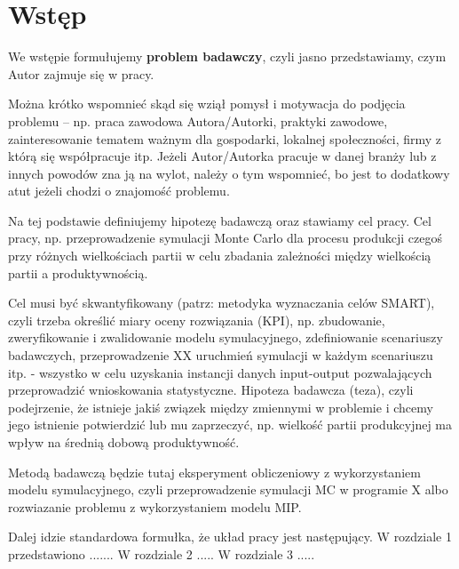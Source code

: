 \section*{Wstęp} 

We wstępie formułujemy \textbf{problem badawczy}, czyli jasno przedstawiamy, czym Autor zajmuje się w pracy.


Można krótko wspomnieć skąd się wziął pomysł i motywacja do podjęcia problemu -- np. praca zawodowa Autora/Autorki, praktyki zawodowe, zainteresowanie tematem ważnym dla gospodarki, lokalnej społeczności, firmy z którą się współpracuje itp. Jeżeli Autor/Autorka pracuje w danej branży lub z innych powodów zna ją na wylot, należy o tym wspomnieć, bo jest to dodatkowy atut jeżeli chodzi o znajomość problemu. 


Na tej podstawie definiujemy hipotezę badawczą oraz stawiamy cel pracy. Cel pracy, np. przeprowadzenie symulacji Monte Carlo dla procesu produkcji czegoś przy różnych wielkościach partii w celu zbadania zależności między wielkością partii a produktywnością.


Cel musi być skwantyfikowany (patrz: metodyka wyznaczania celów SMART), czyli trzeba określić miary oceny rozwiązania (KPI), np. zbudowanie, zweryfikowanie i zwalidowanie modelu symulacyjnego, zdefiniowanie scenariuszy badawczych, przeprowadzenie XX uruchmień symulacji w każdym scenariuszu itp. - wszystko w celu uzyskania instancji danych input-output pozwalających przeprowadzić wnioskowania statystyczne.
Hipoteza badawcza (teza), czyli podejrzenie, że istnieje jakiś związek między zmiennymi w problemie i chcemy jego istnienie potwierdzić lub mu zaprzeczyć, np. wielkość partii produkcyjnej ma wpływ na średnią dobową produktywność. 

Metodą badawczą będzie tutaj eksperyment obliczeniowy z wykorzystaniem modelu symulacyjnego, czyli przeprowadzenie symulacji MC w programie X albo rozwiazanie problemu z wykorzystaniem modelu MIP.

Dalej idzie standardowa formułka, że układ pracy jest następujący. W rozdziale 1 przedstawiono ....... W rozdziale 2 ..... W rozdziale 3 .....

